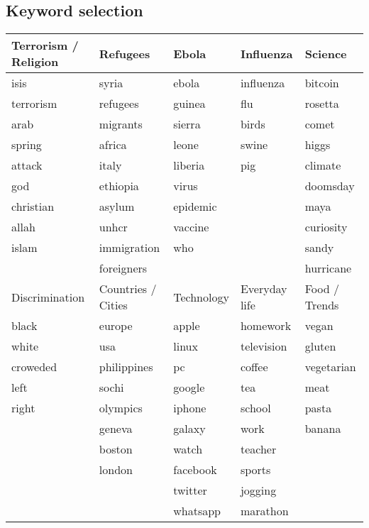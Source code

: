 \documentclass[12pt, a4paper]{article}
\begin{document}
\subsection{Keyword selection}
\begin{center}
  \begin{adjustbox}{max width=\textwidth}\label{tab:keywords}
    \begin{tabular}{ | l | l | l | l | l | }
    \hline
    Terrorism / Religion & Refugees & Ebola & Influenza & Science \\ \hline
    isis & syria & ebola & influenza & bitcoin \\
    terrorism & refugees & guinea & flu & rosetta \\
    arab & migrants & sierra & birds & comet \\
    spring & africa & leone & swine & higgs \\
    attack & italy & liberia & pig & climate \\
    god & ethiopia & virus &  & doomsday \\
    christian & asylum & epidemic &  & maya \\
    allah & unhcr & vaccine &  & curiosity \\
    islam & immigration & who &  & sandy \\
     & foreigners &  &  & hurricane \\ \hline \hline
     
    Discrimination & Countries / Cities & Technology & Everyday life & Food / Trends \\ \hline
    
    black & europe & apple & homework & vegan \\
    white & usa & linux & television & gluten \\
    croweded & philippines & pc & coffee & vegetarian \\
    left & sochi & google & tea & meat \\
    right & olympics & iphone & school & pasta \\
     & geneva & galaxy & work & banana \\
     & boston & watch & teacher & \\
     & london & facebook & sports & \\
     &  & twitter & jogging & \\
     &  & whatsapp &  marathon & \\ \hline \hline
     

\end{tabular}
\end{adjustbox}
\end{center}
\end{document}
